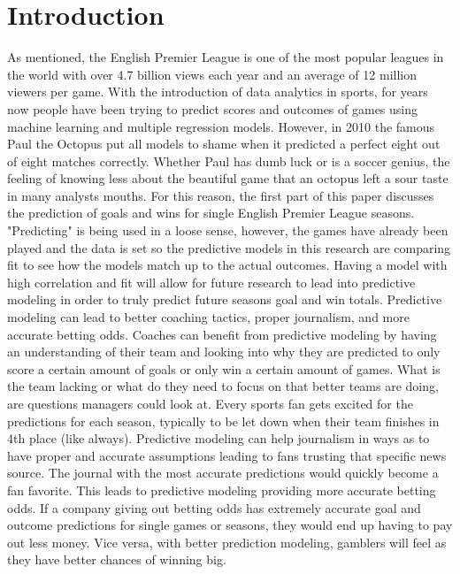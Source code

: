 \documentclass[12pt,english]{article}
\begin{document}
\section{Introduction}\label{sec:intro}
\begin{Introduction}


\begin{doublespace}
As mentioned, the English Premier League is one of the most popular leagues in the world with over 4.7 billion views each year and an average of 12 million viewers per game. With the introduction of data analytics in sports, for years now people have been trying to predict scores and outcomes of games using machine learning and multiple regression models. However, in 2010 the famous Paul the Octopus put all models to shame when it predicted a perfect eight out of eight matches correctly. Whether Paul has dumb luck or is a soccer genius, the feeling of knowing less about the beautiful game that an octopus left a sour taste in many analysts mouths. For this reason, the first part of this paper discusses the prediction of goals and wins for single English Premier League seasons. "Predicting" is being used in a loose sense, however, the games have already been played and the data is set so the predictive models in this research are comparing fit to see how the models match up to the actual outcomes. Having a model with high correlation and fit will allow for future research to lead into predictive modeling in order to truly predict future seasons goal and win totals. Predictive modeling can lead to better coaching tactics, proper journalism, and more accurate betting odds. Coaches can benefit from predictive modeling by having an understanding of their team and looking into why they are predicted to only score a certain amount of goals or only win a certain amount of games. What is the team lacking or what do they need to focus on that better teams are doing, are questions managers could look at. Every sports fan gets excited for the predictions for each season, typically to be let down when their team finishes in 4th place (like always). Predictive modeling can help journalism in ways as to have proper and accurate assumptions leading to fans trusting that specific news source. The journal with the most accurate predictions would quickly become a fan favorite. This leads to predictive modeling providing more accurate betting odds. If a company giving out betting odds has extremely accurate goal and outcome predictions for single games or seasons, they would end up having to pay out less money. Vice versa, with better prediction modeling, gamblers will feel as they have better chances of winning big.\\

\end{doublespace}
\end{Introduction}
\end{document}
